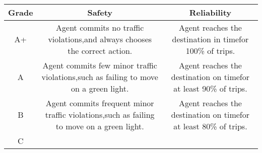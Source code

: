 \documentclass[11pt]{article}
\begin{document}
\begin{longtable}[]{@{}ccc@{}}
\toprule
\begin{minipage}[b]{0.23\columnwidth}\centering
Grade\strut
\end{minipage} & \begin{minipage}[b]{0.26\columnwidth}\centering
Safety\strut
\end{minipage} & \begin{minipage}[b]{0.42\columnwidth}\centering
Reliability\strut
\end{minipage}\tabularnewline
\midrule
\endhead
\begin{minipage}[t]{0.23\columnwidth}\centering
A+\strut
\end{minipage} & \begin{minipage}[t]{0.26\columnwidth}\centering
Agent commits no traffic violations,and always chooses the correct
action.\strut
\end{minipage} & \begin{minipage}[t]{0.42\columnwidth}\centering
Agent reaches the destination in timefor 100\% of trips.\strut
\end{minipage}\tabularnewline
\begin{minipage}[t]{0.23\columnwidth}\centering
A\strut
\end{minipage} & \begin{minipage}[t]{0.26\columnwidth}\centering
Agent commits few minor traffic violations,such as failing to move on a
green light.\strut
\end{minipage} & \begin{minipage}[t]{0.42\columnwidth}\centering
Agent reaches the destination on timefor at least 90\% of trips.\strut
\end{minipage}\tabularnewline
\begin{minipage}[t]{0.23\columnwidth}\centering
B\strut
\end{minipage} & \begin{minipage}[t]{0.26\columnwidth}\centering
Agent commits frequent minor traffic violations,such as failing to move
on a green light.\strut
\end{minipage} & \begin{minipage}[t]{0.42\columnwidth}\centering
Agent reaches the destination on timefor at least 80\% of trips.\strut
\end{minipage}\tabularnewline
\begin{minipage}[t]{0.23\columnwidth}\centering
C\strut
\end{minipage} & \begin{minipage}[t]{0.26\columnwidth}\centering

\end{minipage}
\end{longtable}
\end{document}
